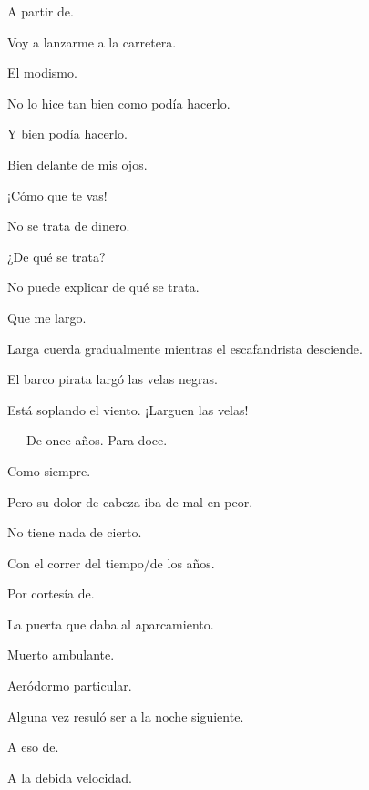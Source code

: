 \sk
A partir de. 

\sk
Voy a lanzarme a la carretera. 

\sk
El modismo. 

\sk
No lo hice tan bien como podía hacerlo. 

\sk
Y bien podía hacerlo. 

\sk
Bien delante de mis ojos. 

\sk
¡Cómo que te vas! 

\sk
No se trata de dinero. 

\sk
¿De qué se trata? 

\sk
No puede explicar de qué se trata. \nb{}

\sk
Que me largo. 

\sk
Larga cuerda gradualmente mientras el escafandrista desciende. 

\sk
El barco pirata largó las velas negras. 

\sk
Está soplando el viento. ¡Larguen las velas! 

\sk
---~De once años. Para doce. 

\sk
Como siempre. 

\sk
Pero su dolor de cabeza iba de mal en peor. 

\sk
No tiene nada de cierto. 

\sk
Con el correr del tiempo/de los años. 

\sk
Por cortesía de. 

\sk
La puerta que daba al aparcamiento. 

\sk
Muerto ambulante. 

\sk
Aeródormo particular. 

\sk
Alguna vez resuló ser a la noche siguiente. 

\sk
A eso de. 

\sk
A la debida velocidad. 

